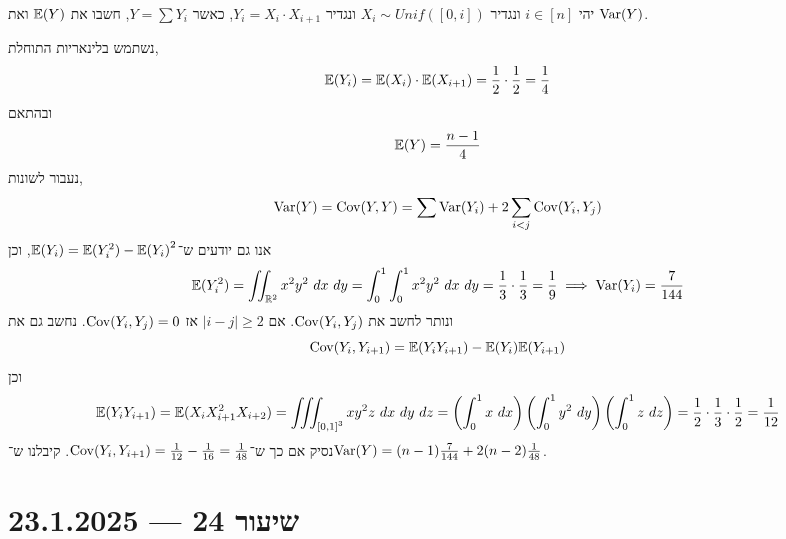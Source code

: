 \begin{exercise}
	יהי $i \in [n]$ ונגדיר $X_i \sim Unif([0, i])$ ונגדיר $Y_i = X_i \cdot X_{i + 1}$, כאשר $Y = \sum Y_i$,
	חשבו את $\mathbb{E}(Y)$ ואת $\operatorname{Var}(Y)$.
\end{exercise}
\begin{solution}
	נשתמש בלינאריות התוחלת,
	\[
		\mathbb{E}(Y_i)
		= \mathbb{E}(X_i) \cdot \mathbb{E}(X_{i + 1})
		= \frac{1}{2} \cdot \frac{1}{2}
		= \frac{1}{4}
	\]
	ובהתאם
	\[
		\mathbb{E}(Y)
		= \frac{n - 1}{4}
	\]
	נעבור לשונות,
	\[
		\operatorname{Var}(Y)
		= \operatorname{Cov}(Y, Y)
		= \sum \operatorname{Var}(Y_i) + 2 \sum_{i < j} \operatorname{Cov}(Y_i, Y_j)
	\]
	אנו גם יודעים ש־$\mathbb{E}(Y_i) = \mathbb{E}(Y_i^2) - {\mathbb{E}(Y_i)}^2$, וכן
	\[
		\mathbb{E}(Y_i^2)
		= \iint_{\mathbb{R}^2} x^2 y^2\ dx\ dy
		= \int_0^1 \int_0^1 x^2 y^2\ dx\ dy
		= \frac{1}{3} \cdot \frac{1}{3}
		= \frac{1}{9}
		\implies \operatorname{Var}(Y_i)
		= \frac{7}{144}
	\]
	ונותר לחשב את $\operatorname{Cov}(Y_i, Y_j)$. אם $|i - j| \ge 2$ אז $\operatorname{Cov}(Y_i, Y_j) = 0$.
	נחשב גם את
	\[
		\operatorname{Cov}(Y_i, Y_{i + 1})
		= \mathbb{E}(Y_i Y_{i + 1}) - \mathbb{E}(Y_i) \mathbb{E}(Y_{i + 1})
	\]
	וכן
	\[
		\mathbb{E}(Y_i Y_{i + 1})
		= \mathbb{E}(X_i X_{i + 1}^2 X_{i + 2})
		= \iiint_{{[0, 1]}^3} x y^2 z\ dx\ dy\ dz
		= \left( \int_0^1 x\ dx \right) \left( \int_0^1 y^2\ dy \right) \left( \int_0^1 z\ dz \right)
		= \frac{1}{2} \cdot \frac{1}{3} \cdot \frac{1}{2}
		= \frac{1}{12}
	\]
	נסיק אם כך ש־$\operatorname{Cov}(Y_i, Y_{i + 1}) = \frac{1}{12} - \frac{1}{16} = \frac{1}{48}$.
	קיבלנו ש־$\operatorname{Var}(Y) = (n - 1) \frac{7}{144} + 2(n - 2) \frac{1}{48}$.
\end{solution}

\section{שיעור 24 --- 23.1.2025}
